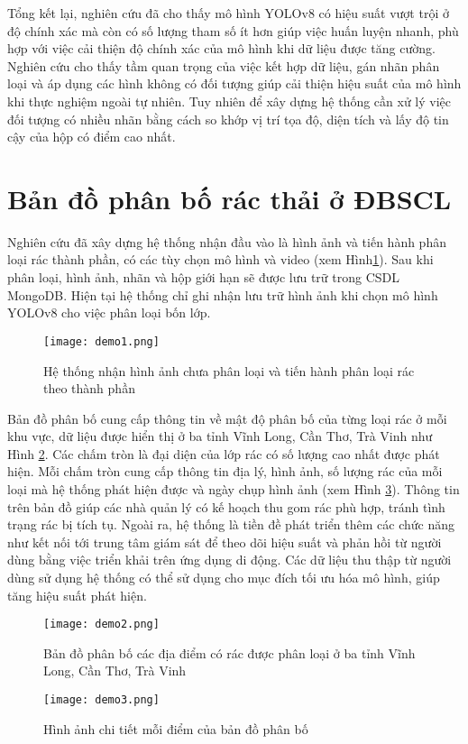 \documentclass[../the.tex]{subfiles}
\begin{document}
\bigskip
{\fontsize{13}{12} \selectfont

    Tổng kết lại, nghiên cứu đã cho thấy mô hình YOLOv8 có hiệu suất vượt trội ở độ chính xác
    mà còn có số lượng tham số ít hơn giúp việc huấn luyện nhanh, phù hợp với việc cải thiện độ chính xác của mô hình khi dữ liệu được tăng cường.
    Nghiên cứu cho thấy tầm quan trọng của việc kết hợp dữ liệu, gán nhãn phân loại và áp dụng các hình không có đối tượng giúp cải thiện hiệu suất của mô hình khi thực nghiệm ngoài tự nhiên.
    Tuy nhiên để xây dựng hệ thống cần xử lý việc đối tượng có nhiều nhãn bằng cách so khớp vị trí tọa độ, diện tích và lấy độ tin cậy của hộp có điểm cao nhất.
}

\section{Bản đồ phân bố rác thải ở ĐBSCL}
{\fontsize{13}{12} \selectfont 

Nghiên cứu đã xây dựng hệ thống nhận đầu vào là hình ảnh và tiến hành phân loại rác thành phần, có các tùy chọn mô hình và video (xem Hình\ref{fig:demo1}). 
Sau khi phân loại, hình ảnh, nhãn và hộp giới hạn sẽ được lưu trữ trong CSDL MongoDB.
Hiện tại hệ thống chỉ ghi nhận lưu trữ hình ảnh khi chọn mô hình YOLOv8 cho việc phân loại bốn lớp.

}

\begin{figure}[H]
    \centering
    \texttt{[image: demo1.png]}
    \caption{Hệ thống nhận hình ảnh chưa phân loại và tiến hành phân loại rác theo thành phần}
    \label{fig:demo1}
\end{figure}

{\fontsize{13}{12} \selectfont 

Bản đồ phân bố cung cấp thông tin về mật độ phân bố của từng loại rác ở mỗi khu vực, dữ liệu được hiển thị ở ba tỉnh Vĩnh Long, Cần Thơ, Trà Vinh như Hình \ref{fig:demo2}. 
Các chấm tròn là đại diện của lớp rác có số lượng cao nhất được phát hiện. Mỗi chấm tròn cung cấp thông tin địa lý, hình ảnh, số lượng rác của mỗi loại mà hệ thống phát hiện được và ngày chụp hình ảnh (xem Hình \ref{fig:demo3}).
Thông tin trên bản đồ giúp các nhà quản lý có kế hoạch thu gom rác phù hợp, tránh tình trạng rác bị tích tụ. 
Ngoài ra, hệ thống là tiền đề phát triển thêm các chức năng như kết nối tới trung tâm giám sát để theo dõi hiệu suất và phản hồi từ người dùng bằng việc triển khải trên ứng dụng di động.
Các dữ liệu thu thập từ người dùng sử dụng hệ thống có thể sử dụng cho mục đích tối ưu hóa mô hình, giúp tăng hiệu suất phát hiện. 


}


\begin{figure}[H]
    \centering
    \texttt{[image: demo2.png]}
    \caption{Bản đồ phân bố các địa điểm có rác được phân loại ở ba tỉnh Vĩnh Long, Cần Thơ, Trà Vinh}
    \label{fig:demo2}
\end{figure}


\begin{figure}[H]
    \centering
    \texttt{[image: demo3.png]}
    \caption{Hình ảnh chi tiết mỗi điểm của bản đồ phân bố}
    \label{fig:demo3}
\end{figure}
\end{document}
